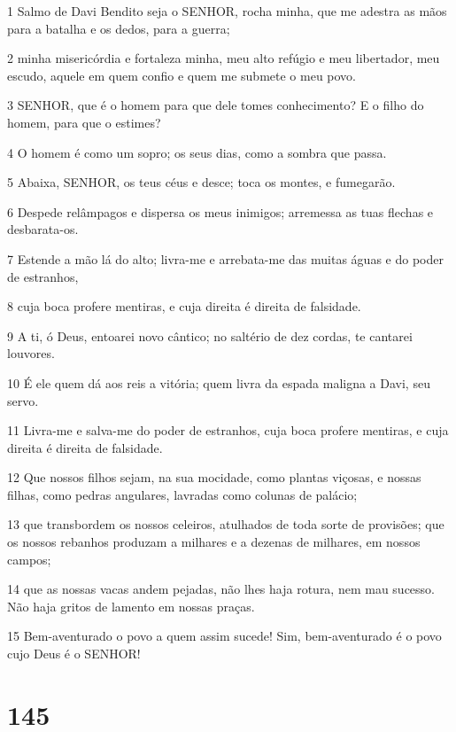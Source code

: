 \par 1 Salmo de Davi Bendito seja o SENHOR, rocha minha, que me adestra as mãos para a batalha e os dedos, para a guerra;
\par 2 minha misericórdia e fortaleza minha, meu alto refúgio e meu libertador, meu escudo, aquele em quem confio e quem me submete o meu povo.
\par 3 SENHOR, que é o homem para que dele tomes conhecimento? E o filho do homem, para que o estimes?
\par 4 O homem é como um sopro; os seus dias, como a sombra que passa.
\par 5 Abaixa, SENHOR, os teus céus e desce; toca os montes, e fumegarão.
\par 6 Despede relâmpagos e dispersa os meus inimigos; arremessa as tuas flechas e desbarata-os.
\par 7 Estende a mão lá do alto; livra-me e arrebata-me das muitas águas e do poder de estranhos,
\par 8 cuja boca profere mentiras, e cuja direita é direita de falsidade.
\par 9 A ti, ó Deus, entoarei novo cântico; no saltério de dez cordas, te cantarei louvores.
\par 10 É ele quem dá aos reis a vitória; quem livra da espada maligna a Davi, seu servo.
\par 11 Livra-me e salva-me do poder de estranhos, cuja boca profere mentiras, e cuja direita é direita de falsidade.
\par 12 Que nossos filhos sejam, na sua mocidade, como plantas viçosas, e nossas filhas, como pedras angulares, lavradas como colunas de palácio;
\par 13 que transbordem os nossos celeiros, atulhados de toda sorte de provisões; que os nossos rebanhos produzam a milhares e a dezenas de milhares, em nossos campos;
\par 14 que as nossas vacas andem pejadas, não lhes haja rotura, nem mau sucesso. Não haja gritos de lamento em nossas praças.
\par 15 Bem-aventurado o povo a quem assim sucede! Sim, bem-aventurado é o povo cujo Deus é o SENHOR!

\chapter{145}

